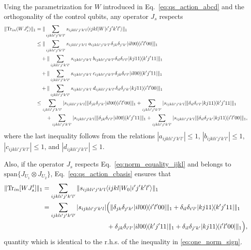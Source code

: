 \documentclass[a4paper,twocolumn,accepted=2022-10-23]{quantumarticle}
\newcommand{\bra}[1]{\langle {#1} \vert}
\newcommand{\ket}[1]{\vert {#1} \rangle}
\newcommand{\ketbra}[2]{\vert {#1} \rangle\!\langle {#2} \vert}
\newcommand{\Tr}[0]{{\mathrm{Tr}}}
\theoremstyle{definition}
\begin{document}
Using the parametrization for $W$ introduced in Eq.~\eqref{eq:qs_action_abcd} and the orthogonality of the control qubits, any operator $J_{s}$ respects
\small
\begin{align}
\| \Tr_{in} (W J_{s}^t) \|_1
&= \| \sum_{ijkli'j'k'l'} s_{ijkli'j'k'l}  \bra{ijkl} W \ket{i'j'k'l'}  \|_1 \\
&\leq \| \sum_{ijkli'j'k'l'} s_{ijkli'j'k'l} \; a_{ijkli'j'k'l'} \delta_{jk}\delta_{j'k'} \ketbra{il00}{i'l'00} \|_1 \notag \\
&\quad + \| \sum_{ijkli'j'k'l'} s_{ijkli'j'k'l}\; b_{ijkli'j'k'l'} \delta_{il}\delta_{i'l'} \ketbra{kj11}{k'j'11} \|_1 \notag \\
&\quad + \| \sum_{ijkli'j'k'l'} s_{ijkli'j'k'l}\; c_{ijkli'j'k'l'} \delta_{jk}\delta_{i'l'} \ketbra{il00}{k'j'11} \|_1  \notag \\
&\quad + \| \sum_{ijkli'j'k'l'} s_{ijkli'j'k'l} \;d_{ijkli'j'k'l'} \delta_{il}\delta_{j'k'} \ketbra{kj11}{i'l'00} \|_1 \nonumber \\
&\leq  \sum_{ijkli'j'k'l'}  |s_{ijkli'j'k'l} | \| \delta_{jk}\delta_{j'k'} \ketbra{il00}{i'l'00} \|_1 +  \sum_{ijkli'j'k'l'}  |s_{ijkli'j'k'l} | \|  \delta_{il}\delta_{i'l'} \ketbra{kj11}{k'j'11} \|_1 \label{eq:one_norm_sign} \\
&\quad \quad + \sum_{ijkli'j'k'l'}   |s_{ijkli'j'k'l} | \| \delta_{jk}\delta_{i'l'} \ketbra{il00}{k'j'11} \|_1 \notag +  \sum_{ijkli'j'k'l'}  |s_{ijkli'j'k'l} | \|  \delta_{il}\delta_{j'k'} \ketbra{kj11}{i'l'00} \|_1,
\end{align}
\normalsize
where the last inequality follows from the relations $|a_{ijkli'j'k'l'}| \leq 1$, $|b_{ijkli'j'k'l'}| \leq 1$, $|c_{ijkli'j'k'l'}| \leq 1$, and $|d_{ijkli'j'k'l'}| \leq 1$.

Also, if the operator $J_{s}$ respects Eq.~\eqref{eq:norm_equality_ijkl} and belongs to $\mathrm{span} \{ J_{U_1} \otimes J_{U_2} \}$, Eq.~\eqref{eq:qs_action_cbasis} ensures that
\begin{align}
\| \Tr_{in} [W J_{s}^t] \|_1
&= \sum_{ijkli'j'k'l'}  \| s_{ijkli'j'k'l} \bra{ijkl}W_0 \ket{i'j'k'l'} \|_1\\
&= \sum_{ijkli'j'k'l'}  |s_{ijkli'j'k'l} | \Big(\| \delta_{jk}\delta_{j'k'} \ketbra{il00}{i'l'00} \|_1 + \delta_{il}\delta_{i'l'} \ketbra{kj11}{k'j'11} \|_1 \notag \\
&\qquad\qquad\qquad\qquad\qquad+ \delta_{jk}\delta_{i'l'} \ketbra{il00}{k'j'11} \|_1 +\delta_{il}\delta_{j'k'} \ketbra{kj11}{i'l'00} \|_1 \Big) \label{eq:one_norm_nosign} ,
\end{align}
quantity which is identical to the r.h.s. of the inequality in \eqref{eq:one_norm_sign}.
\end{document}
